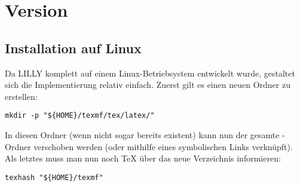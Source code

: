 \section{Version \small{}}
\subsection{Installation auf Linux}
Da LILLY komplett auf einem Linux-Betriebsystem entwickelt wurde, gestaltet sich die Implementierung relativ einfach.
Zuerst gilt es einen neuen Ordner zu erstellen:
\begin{lstlisting}[language=lBash]
mkdir -p "${HOME}/texmf/tex/latex/"
\end{lstlisting}
In diesen Ordner (wenn nicht sogar bereits existent) kann nun der gesamte -Ordner verschoben werden (oder mithilfe eines symbolischen Links verknüpft). Als letztes muss man nun noch \TeX{} über das neue Verzeichnis informieren:
\begin{lstlisting}[language=lBash]
texhash "${HOME}/texmf"
\end{lstlisting}

